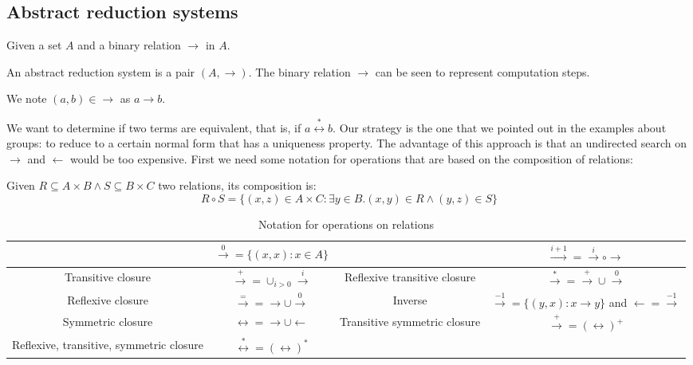 \subsection{Abstract reduction systems}

\begin{definition}
Given a set $A$ and a binary relation $\to$ in $A$.

An abstract reduction system is a pair $(A,\to)$. The binary relation $\to$ can be seen to represent computation steps. 

We note $(a,b) \in \to$ as $a \to b$. 
\end{definition}

We want to determine if two terms are equivalent, that is, if $a \stackrel{*}{\leftrightarrow} b$. Our strategy is the one that we pointed out in the examples about groups: to reduce to a certain normal form that has a uniqueness property. The advantage of this approach is that an undirected search on $\to$ and $\gets$ would be too expensive. First we need some notation for operations that are based on the composition of relations: 

Given $R \subseteq A \times B \land S \subseteq B \times C$ two relations, its composition is: $$R \circ S = \{(x,z) \in A \times C: \exists y \in B. (x,y) \in R \land (y,z) \in S\}$$

\begin{table}[H]
\centering
\begin{adjustwidth}{-2cm}{}
\begin{tabular}{|| c | c | c | c ||}
\hline
\hline & $\stackrel{0}{\rightarrow} = \{(x,x):x \in A \}$ & & $\stackrel{i+1}{\rightarrow} = \stackrel{i}{\rightarrow} \circ \to$ \\
\hline Transitive closure & $\stackrel{+}{\rightarrow} = \cup_{i > 0} \stackrel{i}{\rightarrow}$ & Reflexive transitive closure & $\stackrel{*}{\rightarrow} = \stackrel{+}{\rightarrow} \cup \stackrel{0}{\rightarrow}$ \\
\hline  Reflexive closure & $\stackrel{=}{\rightarrow} = \to \cup \stackrel{0}{\rightarrow}$ & Inverse & $\stackrel{-1}{\rightarrow} = \{(y,x):x \to y\}$ and $\leftarrow= \stackrel{-1}{\rightarrow}$ \\
\hline  Symmetric closure & $\leftrightarrow = \to \cup \leftarrow$ & Transitive symmetric closure & $\stackrel{+}{\rightarrow} = (\leftrightarrow)^+$ \\
\hline Reflexive, transitive, symmetric closure &  $\stackrel{*}{\leftrightarrow} = (\leftrightarrow)^*$ & & \\
\hline
\end{tabular}
\end{adjustwidth}
\caption{Notation for operations on relations}
\label{table:notation1}
\end{table}

